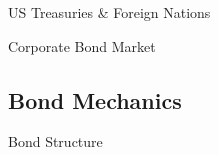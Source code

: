 \documentclass[10pt]{article}
\begin{document}
    \begin{core}{US Treasuries \& Foreign Nations}




    \end{core}

    \begin{core}{Corporate Bond Market}


    \end{core}

  \subsection{Bond Mechanics}

    \begin{core}{Bond Structure}


    \end{core}
\end{document}

